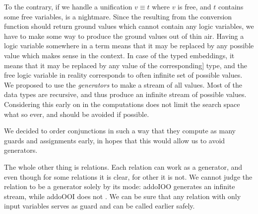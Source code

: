 To the contrary, if we handle a unification $v \equiv t$ where $v$ is free, and $t$ contains some free variables, is a nightmare. 
Since the resulting from the conversion function should return ground values which cannot contain any logic variables, we have to make some way to produce the ground values out of thin air. 
Having a logic variable somewhere in a term means that it may be replaced by any possible value which makes sense in the context. 
In case of the typed \mk embeddings, it means that it may be replaced by any value of the corresponding] type, and the free logic variable in reality corresponds to often infinite set of possible values. 
We proposed to use the \emph{generators} to make a stream of all values. 
Most of the data types are recursive, and thus produce an infinite stream of possible values. 
Considering this early on in the computations does not limit the search space what so ever, and should be avoided if possible. 

We decided to order conjunctions in such a way that they compute as many guards and assignments early, in hopes that this would allow us to avoid generators. 

The whole other thing is relations. 
Each relation can work as a generator, and even though for some relations it is clear, for other it is not. 
We cannot judge the relation to be a generator solely by its mode: addoIOO generates an infinite stream, while addoOOI does not . 
We can be sure that any relation with only input variables serves as guard and can be called earlier safely. 




